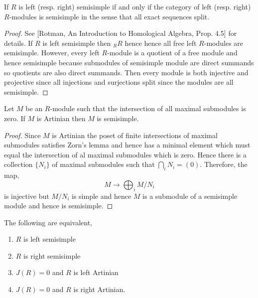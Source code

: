 \documentclass[12pt]{article}
\begin{document}
\begin{prop}
If $R$ is left (resp. right) semisimple if and only if the category of left (resp. right) $R$-modules is semisimple in the sense that all exact sequences split.
\end{prop}

\begin{proof}
See [Rotman, An Introduction to Homological Algebra, Prop. 4.5] for details. If $R$ is left semisimple then ${}_R R$ hence hence all free left $R$-modules are semisimple. However, every left $R$-module is a quotient of a free module and hence semisimple because submodules of semisimple module are direct summands so quotients are also direct summands. Then every module is both injective and projective since all injections and surjections split since the modules are all semisimple.
\end{proof}

\begin{lemma}
Let $M$ be an $R$-module such that the intersection of all maximal submodules is zero. If $M$ is Artinian then $M$ is semisimple.
\end{lemma}

\begin{proof}
Since $M$ is Artinian the poset of finite intersections of maximal submodules satisfies Zorn's lemma and hence has a minimal element which must equal the intersection of al maximal submodules which is zero. Hence there is a collection $\{ N_i \}$ of maximal submodules such that $\bigcap_i N_i = (0)$. Therefore, the map,
\[ M \to \bigoplus_{i} M/N_i \]
is injective but $M/N_i$ is simple and hence $M$ is a submodule of a semisimple module and hence is semisimple.
\end{proof}

\begin{prop}
The following are equivalent,
\begin{enumerate}
\item $R$ is left semisimple
\item $R$ is right semisimple
\item $J(R) = 0$ and $R$ is left Artinian 
\item $J(R) = 0$ and $R$ is right Artinian.
\end{enumerate}
\end{prop}
\end{document}
